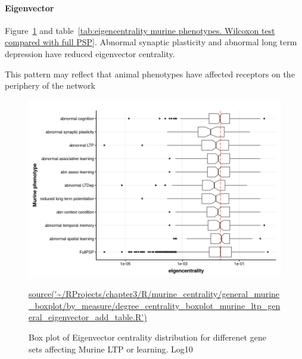 



\paragraph{Eigenvector}


Figure~\ref{fig:murine_ltp_centrality_boxplot_eigenvector} and table~\ref{tab:eigencentrality murine phenotypes. Wilcoxon test compared with full PSP}. Abnormal synaptic plasticity and abnormal long term depression have reduced eigenvector centrality. 

This pattern may reflect that animal phenotypes have affected receptors on the periphery of the network
\begin{figure}
    \centering
    \includegraphics[width=\textwidth]{images/chapter3/ggplot2/murine_centrality_boxplot/add_theme/addLTP/Rplot_eigen_edit.png}
    \caption{Box plot of Eigenvector centrality distribution for differenet gene sets affecting Murine LTP or learning. Log10} 
   \tiny\url{source('~/RProjects/chapter3/R/murine_centrality/general_murine_boxplot/by_measure/degree_centrality_boxplot_murine_ltp_general_eigenvector_add_table.R')}
    \label{fig:murine_ltp_centrality_boxplot_eigenvector}
\end{figure}


